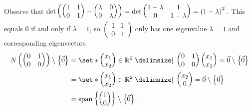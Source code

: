 \documentclass[main.tex]{subfiles}
\begin{document}
\begin{soln}
    Observe that $\det\left( \begin{pmatrix}1 & 1 \\ 0 & 1\end{pmatrix} - \begin{pmatrix}\lambda & 0 \\ 0 &\lambda\end{pmatrix} \right) = \det\begin{pmatrix} 1 - \lambda & 1 \\ 0 & 1 - \lambda\end{pmatrix} = \left( 1 - \lambda \right)^2.$ This equals $0$ if and only if $\lambda = 1$, so $\begin{pmatrix}1 & 1 \\ 0 & 1\end{pmatrix}$ only has one eigenvalue $\lambda = 1$ and corresponding eigenvectors 
    \begin{align*}
        N\parens{\begin{pmatrix}
            0 & 1 \\
            0 & 0
        \end{pmatrix}} \setminus\braces{\vec{0}} &= \set*{\begin{pmatrix} x_1 \\ x_2\end{pmatrix} \in \RR^2\mid \begin{pmatrix}
            0 & 1 \\
            0 & 0
        \end{pmatrix}\begin{pmatrix} x_1 \\ x_2\end{pmatrix} = \vec{0}}\setminus \braces{\vec{0}} \\
        &= \set*{\begin{pmatrix} x_1 \\ x_2\end{pmatrix} \in \RR^2 \mid \begin{pmatrix} x_2 \\ 0\end{pmatrix} = \vec{0}}\setminus \braces{\vec{0}} \\
        &= \vspan\braces{\begin{pmatrix}
            1 \\ 0
        \end{pmatrix}} \setminus \braces{\vec{0}}.
    \end{align*}
\end{soln}
\eject
\end{document}
